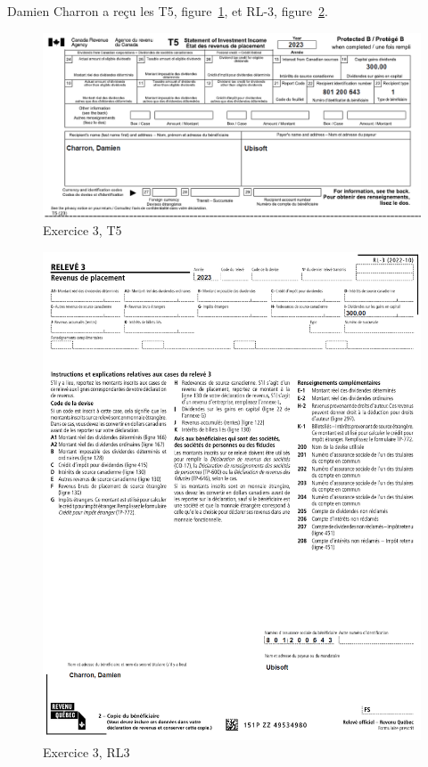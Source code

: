 \begin{question}
	Damien Charron a reçu les T5, figure~\ref{fig:chap6Exercice3T5}, et RL-3, figure~\ref{fig:chap6Exercice3RL3}.
	
	\begin{figure}
		\centering
		\includegraphics[width=.9\textwidth]{exercice/6-3/Q2/T5.png}
		\caption[]{Exercice 3, T5}
		\label{fig:chap6Exercice3T5}
	\end{figure}
	
	\begin{figure}
		\centering
		\includegraphics[width=.9\textwidth]{exercice/6-3/Q2/RL3.png}
		\caption[]{Exercice 3, RL3}
		\label{fig:chap6Exercice3RL3}
	\end{figure}
\end{question}

